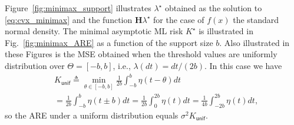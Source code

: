 \documentclass[letterpaper, conference, 11pt]{IEEEtran}      %
\newcommand{\unif}{\mathsf{unif}}
\begin{document}
Figure~\ref{fig:minimax_support} illustrates $\lambda^\star$ obtained as the solution to \eqref{eq:cvx_minimax} and the function $\mathbf H \lambda^\star$ for the case of $f(x)$ the standard  normal density. The minimal asymptotic ML risk $K^\star$ is illustrated in Fig.~\ref{fig:minimax_ARE} as a function of the support size $b$. Also illustrated in these Figures is the MSE obtained when the threshold values are uniformly distribution over $\Theta = [-b,b]$, i.e., 
$\lambda(dt) = dt/(2b)$. In this case we have
\begin{align}
& K_{\unif} \triangleq \min_{\theta \in [-b,b]} \frac{1}{2b}\int_{-b}^{b} \eta\left(t-\theta\right) dt \nonumber
 \\
& = 
\frac{1}{2b}\int_{-b}^{b} \eta\left(t\pm b\right) dt
= \frac{1}{2b}\int_{0}^{2b} \eta(t) dt = \frac{1}{4b}\int_{-2b}^{2b} \eta(t) dt, \label{eq:uniform_risk}
\end{align}
so the ARE under a uniform distribution equals $\sigma^2 K_\unif$. \\
\end{document}
